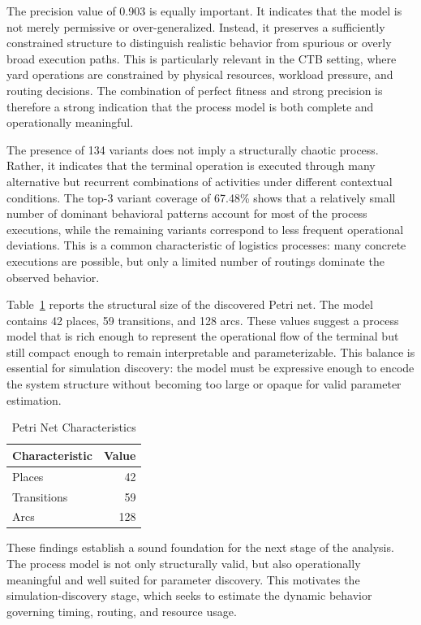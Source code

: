 The precision value of 0.903 is equally important. It indicates that the model is not merely permissive or over-generalized. Instead, it preserves a sufficiently constrained structure to distinguish realistic behavior from spurious or overly broad execution paths. This is particularly relevant in the CTB setting, where yard operations are constrained by physical resources, workload pressure, and routing decisions. The combination of perfect fitness and strong precision is therefore a strong indication that the process model is both complete and operationally meaningful.

The presence of 134 variants does not imply a structurally chaotic process. Rather, it indicates that the terminal operation is executed through many alternative but recurrent combinations of activities under different contextual conditions. The top-3 variant coverage of 67.48\% shows that a relatively small number of dominant behavioral patterns account for most of the process executions, while the remaining variants correspond to less frequent operational deviations. This is a common characteristic of logistics processes: many concrete executions are possible, but only a limited number of routings dominate the observed behavior.

Table~\ref{tab:petri_net_characteristics} reports the structural size of the discovered Petri net. The model contains 42 places, 59 transitions, and 128 arcs. These values suggest a process model that is rich enough to represent the operational flow of the terminal but still compact enough to remain interpretable and parameterizable. This balance is essential for simulation discovery: the model must be expressive enough to encode the system structure without becoming too large or opaque for valid parameter estimation.

\begin{table}[h!]
\centering
\caption{Petri Net Characteristics}
\label{tab:petri_net_characteristics}
\begin{tabular}{lr}
\toprule
Characteristic & Value \\
\midrule
Places & 42 \\
Transitions & 59 \\
Arcs & 128 \\
\bottomrule
\end{tabular}
\end{table}

These findings establish a sound foundation for the next stage of the analysis. The process model is not only structurally valid, but also operationally meaningful and well suited for parameter discovery. This motivates the simulation-discovery stage, which seeks to estimate the dynamic behavior governing timing, routing, and resource usage.

